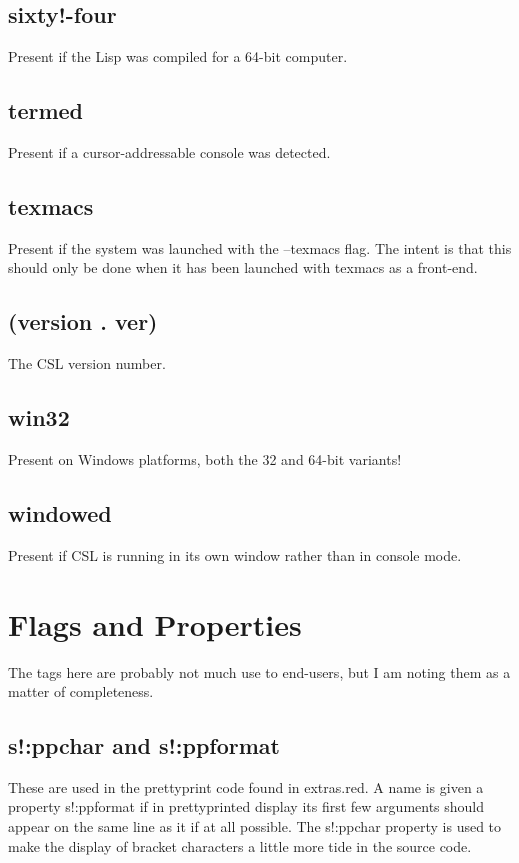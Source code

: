 \documentclass[a4paper,11pt]{article}
\begin{document}
\subsection{\ttfamily sixty!-four}
Present if the Lisp was compiled for a 64-bit computer.
\subsection{\ttfamily termed}
Present if a cursor-addressable console was detected.
\subsection{\ttfamily texmacs}
Present if the system was launched with the {\ttfamily --texmacs} flag.
The intent is that this should only be done when it has been launched with
texmacs as a front-end.
\subsection{\ttfamily (version . ver)}
The CSL version number.
\subsection{\ttfamily win32}
Present on Windows platforms, both the 32 and 64-bit variants!
\subsection{\ttfamily windowed}
Present if CSL is running in its own window rather than in console mode.




\section{Flags and Properties}

The tags here are probably not much use to end-users, but I am noting them
as a matter of completeness.

\subsection{\ttfamily s!:ppchar and \ttfamily s!:ppformat}
These are used in the prettyprint code found in {\ttfamily extras.red}. A
name is given a property {\ttfamily s!:ppformat} if in prettyprinted display
its first few arguments should appear on the same line as it if at all
possible. The {\ttfamily s!:ppchar} property is used to make the display of
bracket characters a little more tide in the source code.
\end{document}
